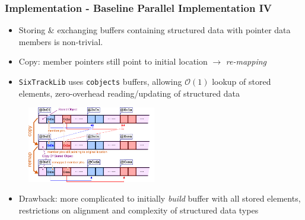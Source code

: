 \documentclass{beamer}
\begin{document}
\begin{frame}
    \frametitle{Implementation - Baseline Parallel Implementation IV}
    \begin{itemize}
        \item Storing \& exchanging buffers containing structured data with pointer data members is non-trivial.
        \item Copy: member pointers still point to initial location $\rightarrow$ \textit{re-mapping}
        \item \texttt{SixTrackLib} uses \texttt{cobjects}\cite{cobjects-repo-2021} buffers, allowing $\mathcal{O}(1)$
              lookup of stored elements, zero-overhead reading/updating of structured data
    \end{itemize}
    \begin{figure}[H]
        \centering
        \includegraphics[width=0.5\textwidth]{poster_images/fig_cobjects}
    \end{figure}
    \begin{itemize}
        \item Drawback: more complicated to initially \textit{build} buffer with all stored elements, restrictions on alignment and complexity of structured data types
    \end{itemize}
\end{frame}
\end{document}
